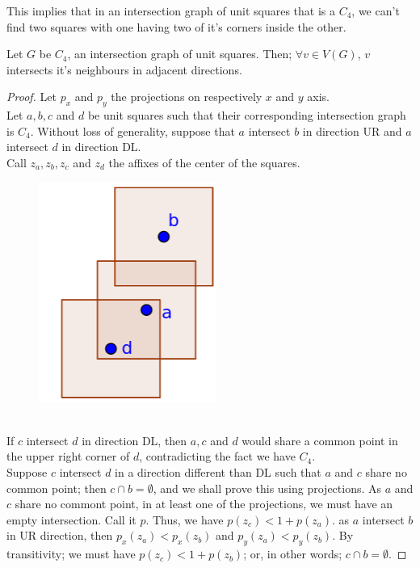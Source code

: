 \documentclass[12pt]{article}
\begin{document}
\begin{remark}
    This implies that in an intersection graph of unit squares that is a $C_4$, we can't find two squares with one having two of it's corners inside the other.  
\end{remark}



\begin{lemma}
    Let $G$ be $C_4$, an intersection graph of unit squares. Then; $\forall v \in V(G)$, $v$ intersects it's neighbours in adjacent directions.
\end{lemma}



\begin{proof}
    Let $p_x$ and $p_y$ the projections on respectively $x$ and $y$ axis.\\
    Let $a, b, c$ and $d$ be unit squares such that their corresponding intersection graph is $C_4$. Without loss of generality, suppose 
    that $a$ intersect $b$ in direction UR and $a$ intersect $d$ in direction DL. \\ 
    Call $z_a, z_b, z_c$ and $z_d$ the affixes of the center of the squares.
    \begin{figure}[h]
        \centering
        \includegraphics[scale=0.4]{tex_images/proof_1_4_1.png}
    \end{figure}
    \\
    If $c$ intersect $d$ in direction DL, then $a, c$ and $d$ would share a common point in the upper right corner of $d$, contradicting the fact we have $C_4$.\\
    Suppose $c$ intersect $d$ in a direction different than DL such that $a$ and $c$ share no common point; then $c \cap b = \emptyset$, and we shall prove this using projections.
    As $a$ and $c$ share no commont point, in at least one of the projections, we must have an empty intersection. Call it $p$.
    Thus, we have $p(z_c) < 1 + p(z_a)$.
    as $a$ intersect $b$ in UR direction, then $p_x(z_a) < p_x(z_b)$ and $p_y(z_a) < p_y(z_b)$.
    By transitivity; we must have $p(z_c) < 1+ p(z_b)$; or, in other words; $c \cap b = \emptyset$.
\end{proof}
\end{document}
